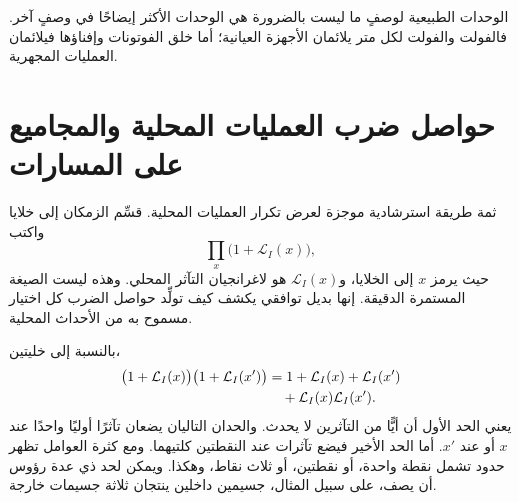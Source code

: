 الوحدات الطبيعية لوصفٍ ما ليست بالضرورة هي الوحدات الأكثر إيضاحًا في وصفٍ آخر. فالفولت والفولت لكل متر يلائمان الأجهزة العيانية؛ أما خلق الفوتونات وإفناؤها فيلائمان العمليات المجهرية.

\begin{classroomqa}
\end{classroomqa}

\section{حواصل ضرب العمليات المحلية والمجاميع على المسارات}

ثمة طريقة استرشادية موجزة لعرض تكرار العمليات المحلية. قسِّم الزمكان إلى خلايا واكتب
\begin{equation}
\prod_x\bigl(1+\mathcal L_I(x)\bigr),
\end{equation}
حيث يرمز \(x\) إلى الخلايا، و\(\mathcal L_I(x)\) هو لاغرانجيان التآثر المحلي. وهذه ليست الصيغة المستمرة الدقيقة. إنها بديل توافقي يكشف كيف تولِّد حواصل الضرب كل اختيار مسموح به من الأحداث المحلية.

\begin{classroomqa}
\end{classroomqa}

بالنسبة إلى خليتين،
\begin{align}
\bigl(1+\mathcal L_I(x)\bigr)
\bigl(1+\mathcal L_I(x')\bigr)
&=
1+\mathcal L_I(x)+\mathcal L_I(x')
\notag\\
&\quad{}+\mathcal L_I(x)\mathcal L_I(x').
\end{align}
يعني الحد الأول أن أيًّا من التآثرين لا يحدث. والحدان التاليان يضعان تآثرًا أوليًا واحدًا عند \(x\) أو عند \(x'\). أما الحد الأخير فيضع تآثرات عند النقطتين كلتيهما. ومع كثرة العوامل تظهر حدود تشمل نقطة واحدة، أو نقطتين، أو ثلاث نقاط، وهكذا. ويمكن لحد ذي عدة رؤوس أن يصف، على سبيل المثال، جسيمين داخلين ينتجان ثلاثة جسيمات خارجة.

